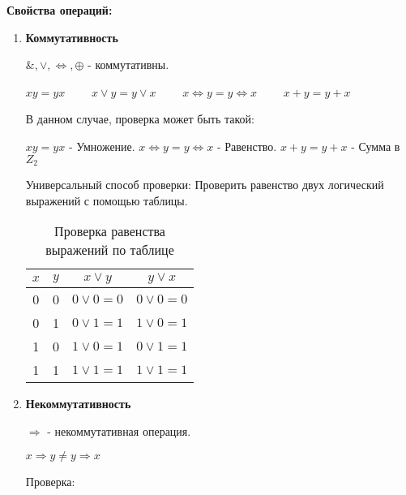 \documentclass[a4paper,12pt]{article}
\begin{document}
\begin{enumerate}
    \end{enumerate}

    \textbf{Свойства операций:}
    \begin{enumerate}
        \item \textbf{Коммутативность}

        $\&,\vee,\Longleftrightarrow,\oplus$ - коммутативны.

        $xy=yx$ $\hspace{20pt}$ $x\vee y=y\vee x$ $\hspace{20pt}$ $ x\Longleftrightarrow y = y\Longleftrightarrow x$ $\hspace{20pt}$ $ x+y=y+x $

        В данном случае, проверка может быть такой:

        $xy=yx$ - Умножение. $ x\Longleftrightarrow y = y\Longleftrightarrow x$ - Равенство. $ x+y=y+x $ - Сумма в $Z_{2}$

        Универсальный способ проверки: Проверить равенство двух логический выражений с помощью таблицы.

        \begin{table}[ht]
            \centering
            \begin{tabular}{|c|c|c|c|}
                \hline
                $x$ & $y$ & $x\vee y$ & $y\vee x$ \\ \hline
                0 & 0 & $0\vee 0=0$ & $0\vee 0=0$ \\ \hline
                0 & 1 & $0\vee 1=1$ & $1\vee 0=1$ \\ \hline
                1 & 0 & $1\vee 0=1$ & $0\vee 1=1$ \\ \hline
                1 & 1 & $1\vee 1=1$ & $1\vee 1=1$ \\ \hline
            \end{tabular}
            \caption{Проверка равенства выражений по таблице}
        \end{table}

        \item \textbf{Некоммутативность}

        $\Longrightarrow $ - некоммутативная операция.

        $x\Longrightarrow y \neq y \Longrightarrow x$

        Проверка:


\end{enumerate}
\end{document}
